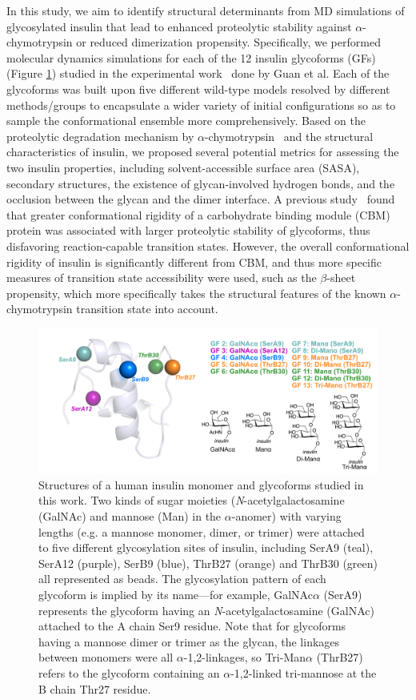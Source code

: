 \documentclass[sn-vancouver]{sn-jnl}
\begin{document}
In this study, we aim to identify structural determinants from MD simulations of glycosylated insulin that lead to enhanced proteolytic stability against $\alpha$-chymotrypsin or reduced dimerization propensity. Specifically, we performed molecular dynamics simulations for each of the 12 insulin glycoforms (GFs) (Figure \ref{sys_of_interest}) studied in the experimental work~\cite{guan2018chemically} done by Guan et al. Each of the glycoforms was built upon five different wild-type models resolved by different methods/groups to encapsulate a wider variety of initial configurations so as to sample the conformational ensemble more comprehensively. Based on the proteolytic degradation mechanism by $\alpha$-chymotrypsin~\cite{schilling1991degradation} and the structural characteristics of insulin, we proposed several potential metrics for assessing the two insulin properties, including solvent-accessible surface area (SASA), secondary structures, the existence of glycan-involved hydrogen bonds, and the occlusion between the glycan and the dimer interface. A previous study~\cite{chaffey2017structural} found that greater conformational rigidity of a carbohydrate binding module (CBM) protein was associated with larger proteolytic stability of glycoforms, thus disfavoring reaction-capable transition states. However, the overall conformational rigidity of insulin is significantly different from CBM, and thus more specific measures of transition state accessibility were used, such as the $\beta$-sheet propensity, which more specifically takes the structural features of the known $\alpha$-chymotrypsin transition state into account.
\begin{figure}[H]
\centering
\includegraphics[width=\textwidth]{Figures/Fig_glycan_positions.png}
\caption{Structures of a human insulin monomer and glycoforms studied in this work. Two kinds of sugar moieties (\emph{N}-acetylgalactosamine (GalNAc) and mannose (Man) in the $\alpha$-anomer) with varying lengths (e.g. a mannose monomer, dimer, or trimer) were attached to five different glycosylation sites of insulin, including SerA9 (teal), SerA12 (purple), SerB9 (blue), ThrB27 (orange) and ThrB30 (green) all represented as beads. The glycosylation pattern of each glycoform is implied by its name---for example, GalNAc$\alpha$ (SerA9) represents the glycoform having an \emph{N}-acetylgalactosamine (GalNAc) attached to the A chain Ser9 residue. Note that for glycoforms having a mannose dimer or trimer as the glycan, the linkages between monomers were all $\alpha$-1,2-linkages, so Tri-Man$\alpha$ (ThrB27) refers to the glycoform containing an $\alpha$-1,2-linked tri-mannose at the B chain Thr27 residue.}
\label{sys_of_interest}
\end{figure}
\end{document}
